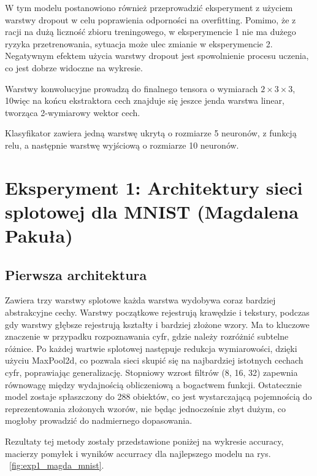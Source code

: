 \documentclass[10pt]{article}
\begin{document}
W tym modelu postanowiono również przeprowadzić eksperyment z użyciem warstwy dropout w celu poprawienia
odporności na overfitting.
Pomimo, że z racji na dużą liczność zbioru treningowego, w eksperymencie 1 nie ma dużego ryzyka przetrenowania,
sytuacja może ulec zmianie w eksperymencie 2. Negatywnym efektem użycia warstwy dropout jest spowolnienie procesu uczenia, co jest dobrze widoczne na wykresie.

Warstwy konwolucyjne prowadzą do finalnego tensora o wymiarach $2 \times 3 \times 3$, 10więc na końcu ekstraktora cech znajduje się jeszce jenda warstwa linear, tworząca 2-wymiarowy wektor cech.

Klasyfikator zawiera jedną warstwę ukrytą o rozmiarze 5 neuronów, z funkcją relu, a następnie warstwę wyjściową o rozmiarze 10 neuronów.

\pagebreak
\section{Eksperyment 1: Architektury sieci splotowej dla MNIST (Magdalena Pakuła)}\label{sec:ex1-pakula_mnist}

\subsection*{Pierwsza architektura}
Zawiera trzy warstwy splotowe każda warstwa wydobywa coraz bardziej abstrakcyjne cechy. Warstwy początkowe rejestrują krawędzie i tekstury, podczas gdy warstwy głębsze rejestrują kształty i bardziej złożone wzory. Ma to kluczowe znaczenie w przypadku rozpoznawania cyfr, gdzie należy rozróżnić subtelne różnice.
Po każdej wartwie splotowej następuje redukcja wymiarowości, dzięki użyciu MaxPool2d, co pozwala sieci skupić się na najbardziej istotnych cechach cyfr, poprawiając generalizację.
Stopniowy wzrost filtrów (8, 16, 32) zapewnia równowagę między wydajnością obliczeniową a bogactwem funkcji.
Ostatecznie model zostaje spłaszczony do 288 obiektów, co jest wystarczającą pojemnością do reprezentowania złożonych wzorów, nie będąc jednocześnie zbyt dużym, co mogłoby prowadzić do nadmiernego dopasowania.

Rezultaty tej metody zostały przedstawione poniżej na wykresie accuracy, macierzy pomyłek i wyników accurracy dla najlepszego modelu na rys. ~\ref{fig:exp1_magda_mnist}.

\MagdaMnistLarge{}
\end{document}

